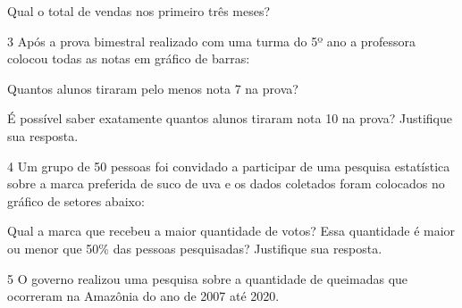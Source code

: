 {\begin{escolha}
\item
  Qual o total de vendas nos primeiro três meses?

\end{escolha}


\num{3} Após a prova bimestral realizado com uma turma do 5º ano a
professora colocou todas as notas em gráfico de barras:


\begin{escolha}
\item
  Quantos alunos tiraram pelo menos nota 7 na prova?


\item
  É possível saber exatamente quantos alunos tiraram nota 10 na prova?
  Justifique sua resposta.

\end{escolha}


\num{4} Um grupo de 50 pessoas foi convidado a participar de uma pesquisa
estatística sobre a marca preferida de suco de uva e os dados coletados
foram colocados no gráfico de setores abaixo:


Qual a marca que recebeu a maior quantidade de votos? Essa quantidade é
maior ou menor que 50\% das pessoas pesquisadas? Justifique sua
resposta.



\num{5} O governo realizou uma pesquisa sobre a quantidade de queimadas que
ocorreram na Amazônia do ano de 2007 até 2020.

}
